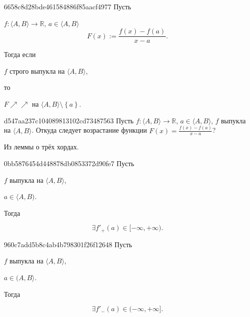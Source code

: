 \begin{note}{6658c8d28bde461584886f85aacf4977}
    Пусть \begin{icloze}{3}\( f : \langle A, B \rangle \to \mathbb R \), \( a \in \langle A, B \rangle  \)
    \[
        F(x) := \frac{f(x) - f(a)}{x - a}.
    \]\end{icloze}

    Тогда если \begin{icloze}{2}\( f \) строго выпукла на \( \langle A, B \rangle  \),\end{icloze} то
    \begin{icloze}{1}
        \begin{center}
            \( F \!\!\nearrow\!\nearrow  \) на \( \langle A, B \rangle \setminus \left\{ a \right\} \).
        \end{center}
    \end{icloze}
\end{note}

\begin{note}{d547aa237c104089813102cd73487563}
    Пусть  \({ f : \langle A, B \rangle \to \mathbb R }\), \({ a \in \langle A, B \rangle }\), \({ f }\) выпукла на \({ \langle A, B \rangle }\).
    Откуда следует возрастание функции \({ F(x) = \frac{f(x) - f(a)}{x - a} }\)?

    \begin{cloze}{1}
        Из леммы о трёх хордах.
    \end{cloze}
\end{note}

\begin{note}{0bb5876454d448878db0853372d90fe7}
    Пусть \begin{icloze}{3}\( f \) выпукла на \( \langle A, B \rangle  \),\end{icloze} \begin{icloze}{2}\( a \in \langle A, B )  \).\end{icloze} Тогда
    \begin{icloze}{1}
        \[
            \exists f'_+(a) \in [-\infty, +\infty ).
        \]
    \end{icloze}
\end{note}

\begin{note}{960c7add5b8c4ab4b798301f26f12648}
    Пусть \begin{icloze}{3}\( f \) выпукла на \( \langle A, B \rangle  \),\end{icloze} \begin{icloze}{2}\( a \in (A, B \rangle  \).\end{icloze} Тогда
    \begin{icloze}{1}
        \[
            \exists f'_-(a) \in (-\infty, +\infty ].
        \]
    \end{icloze}
\end{note}


